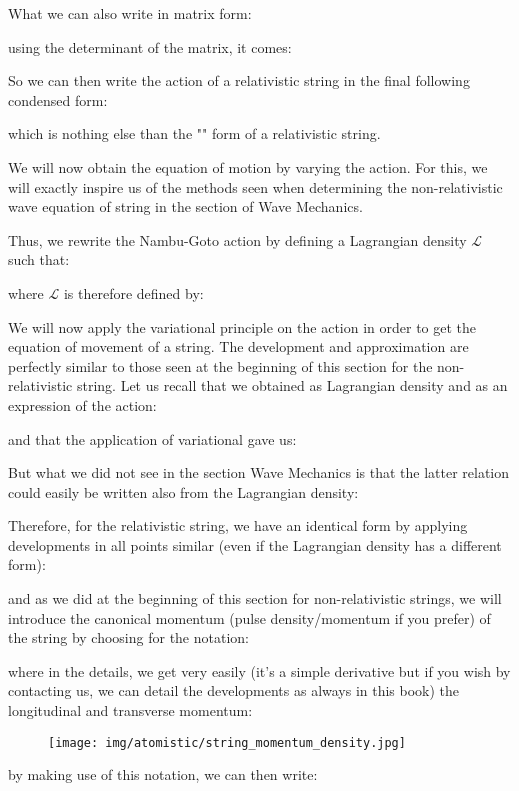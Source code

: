 	What we can also write in matrix form:
	
	using the determinant of the matrix, it comes:
	
	So we can then write the action of a relativistic string in the final following condensed form:
	
	which is nothing else than the "" form of a relativistic string.
	
	We will now obtain the equation of motion by varying the action. For this, we will exactly inspire us of the methods seen when determining the non-relativistic wave equation of string in the section of Wave Mechanics.

	Thus, we rewrite the Nambu-Goto action by defining a Lagrangian density $\mathcal{L}$ such that:
	
	where $\mathcal{L}$ is therefore defined by:
	
	We will now apply the variational principle on the action in order to get the equation of movement of a string. The development and approximation are perfectly similar to those seen at the beginning of this section for the non-relativistic string. Let us recall that we obtained as Lagrangian density and as an expression of the action:
	
	and that the application of variational gave us:
	
	But what we did not see in the section Wave Mechanics is that the latter relation could easily be written also from the Lagrangian density:
	
	Therefore, for the relativistic string, we have an identical form by applying developments in all points similar (even if the Lagrangian density has a different form):
	
	and as we did at the beginning of this section for non-relativistic strings, we will introduce the canonical momentum (pulse density/momentum if you prefer) of the string by choosing for the notation:
	
	where in the details, we get very easily (it's a simple derivative but if you wish by contacting us, we can detail the developments as always in this book) the longitudinal and transverse momentum:
	
	\begin{figure}[H]
		\begin{center}
		\texttt{[image: img/atomistic/string\_momentum\_density.jpg]}
		\end{center}	
	\end{figure}
	by making use of this notation, we can then write:
	

